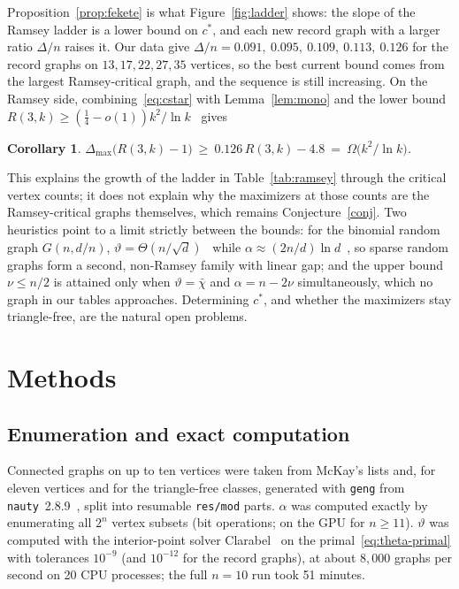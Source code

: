 \documentclass[11pt]{article}
\newtheorem{corollary}{Corollary}
\renewcommand{\theta}{\vartheta}
\newcommand{\gap}{\Delta}
\begin{document}
Proposition~\ref{prop:fekete} is what Figure~\ref{fig:ladder} shows: the slope of the Ramsey ladder is a lower bound on $c^*$, and each new record graph with a larger ratio $\gap/n$ raises it. Our data give $\gap/n=0.091,\ 0.095,\ 0.109,\ 0.113,\ 0.126$ for the record graphs on $13,17,22,27,35$ vertices, so the best current bound comes from the largest Ramsey-critical graph, and the sequence is still increasing. On the Ramsey side, combining~\eqref{eq:cstar} with Lemma~\ref{lem:mono} and the lower bound $R(3,k)\ge(\tfrac14-o(1))k^2/\ln k$~\cite{bohman-keevash,fgm} gives
\begin{corollary}\label{cor:ramsey}
$\gap_{\max}\bigl(R(3,k)-1\bigr)\ \ge\ 0.126\,R(3,k)-4.8\ =\ \Omega\!\bigl(k^2/\ln k\bigr)$.
\end{corollary}
This explains the growth of the ladder in Table~\ref{tab:ramsey} through the critical vertex counts; it does not explain why the maximizers at those counts are the Ramsey-critical graphs themselves, which remains Conjecture~\ref{conj}. Two heuristics point to a limit strictly between the bounds: for the binomial random graph $G(n,d/n)$, $\theta=\Theta(n/\sqrt d)$~\cite{cojaoghlan2005} while $\alpha\approx(2n/d)\ln d$~\cite{frieze1990}, so sparse random graphs form a second, non-Ramsey family with linear gap; and the upper bound $\nu\le n/2$ is attained only when $\theta=\bar\chi$ and $\alpha=n-2\nu$ simultaneously, which no graph in our tables approaches. Determining $c^*$, and whether the maximizers stay triangle-free, are the natural open problems.

\section{Methods}\label{sec:method}

\subsection{Enumeration and exact computation}
Connected graphs on up to ten vertices were taken from McKay's lists and, for eleven vertices and for the triangle-free classes, generated with \texttt{geng} from \texttt{nauty}~2.8.9~\cite{nauty}, split into resumable \texttt{res/mod} parts. $\alpha$ was computed exactly by enumerating all $2^n$ vertex subsets (bit operations; on the GPU for $n\ge 11$). $\theta$ was computed with the interior-point solver Clarabel~\cite{clarabel} on the primal~\eqref{eq:theta-primal} with tolerances $10^{-9}$ (and $10^{-12}$ for the record graphs), at about $8{,}000$ graphs per second on 20 CPU processes; the full $n=10$ run took 51 minutes.
\end{document}
